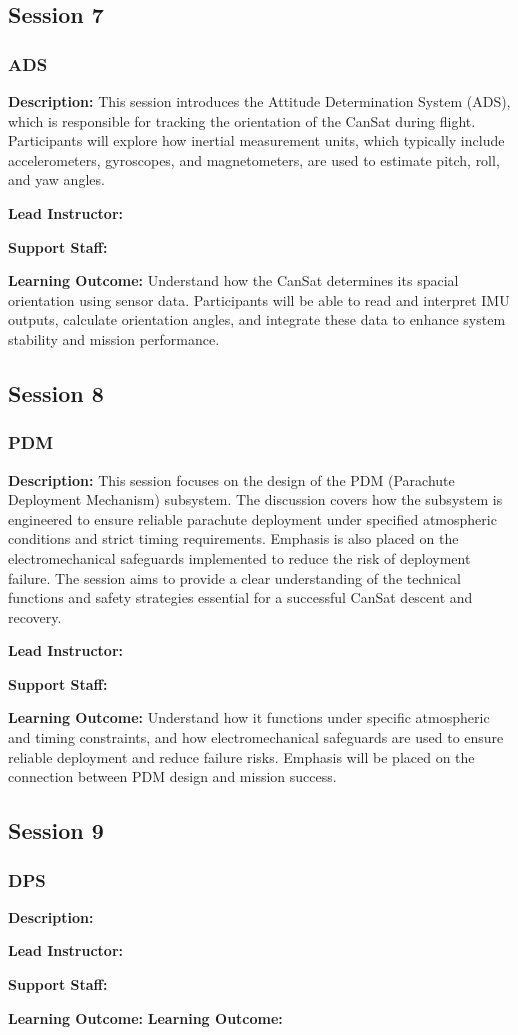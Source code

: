 \documentclass[a4paper,12pt]{article}
\begin{document}
\newpage

\subsection{Session 7}
\subsubsection{ADS}

\textbf{Description:} This session introduces the Attitude Determination System (ADS), which is responsible for tracking the orientation of the CanSat during flight. Participants will explore how inertial measurement units, which typically include accelerometers, gyroscopes, and magnetometers, are used to estimate pitch, roll, and yaw angles.



\textbf{Lead Instructor:}

\textbf{Support Staff: }

\textbf{Learning Outcome:} Understand how the CanSat determines its spacial orientation using sensor data. Participants will be able to read and interpret IMU outputs, calculate orientation angles, and integrate these data to enhance system stability and mission performance.
\newpage

\subsection{Session 8}
\subsubsection{PDM}

\textbf{Description:} This session focuses on the design of the PDM (Parachute Deployment Mechanism) subsystem. The discussion covers how the subsystem is engineered to ensure reliable parachute deployment under specified atmospheric conditions and strict timing requirements. Emphasis is also placed on the electromechanical safeguards implemented to reduce the risk of deployment failure. The session aims to provide a clear understanding of the technical functions and safety strategies essential for a successful CanSat descent and recovery.

\textbf{Lead Instructor:}

\textbf{Support Staff: }


\textbf{Learning Outcome:} Understand how it functions under specific atmospheric and timing constraints, and how electromechanical safeguards are used to ensure reliable deployment and reduce failure risks. Emphasis will be placed on the connection between PDM design and mission success.


\subsection{Session 9}
\subsubsection{DPS}

\textbf{Description:} 

\textbf{Lead Instructor:}

\textbf{Support Staff: }

\textbf{Learning Outcome:} 
\textbf{Learning Outcome:} 
\end{document}
